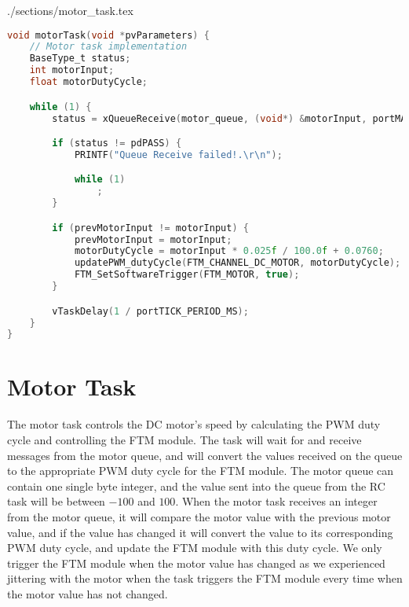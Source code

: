 \begin{filecontents}[overwrite]{./sections/motor_task.tex}
\begin{lstlisting}[language=c,caption=Motor Task, label=list:motor]
void motorTask(void *pvParameters) {
    // Motor task implementation
    BaseType_t status;
    int motorInput;
    float motorDutyCycle;

    while (1) {
        status = xQueueReceive(motor_queue, (void*) &motorInput, portMAX_DELAY);

        if (status != pdPASS) {
            PRINTF("Queue Receive failed!.\r\n");

            while (1)
                ;
        }

        if (prevMotorInput != motorInput) {
            prevMotorInput = motorInput;
            motorDutyCycle = motorInput * 0.025f / 100.0f + 0.0760;
            updatePWM_dutyCycle(FTM_CHANNEL_DC_MOTOR, motorDutyCycle);
            FTM_SetSoftwareTrigger(FTM_MOTOR, true);
        }

        vTaskDelay(1 / portTICK_PERIOD_MS);
    }
}
\end{lstlisting}
\end{filecontents}

\section*{Motor Task}

The motor task controls the DC motor's speed by calculating the PWM duty cycle and controlling the FTM module. The task will wait for and receive messages from the motor queue, and will convert the values received on the queue to the appropriate PWM duty cycle for the FTM module. The motor queue can contain one single byte integer, and the value sent into the queue from the RC task will be between $-100$ and $100$. When the motor task receives an integer from the motor queue, it will compare the motor value with the previous motor value, and if the value has changed it will convert the value to its corresponding PWM duty cycle, and update the FTM module with this duty cycle. We only trigger the FTM module when the motor value has changed as we experienced jittering with the motor when the task triggers the FTM module every time when the motor value has not changed.

